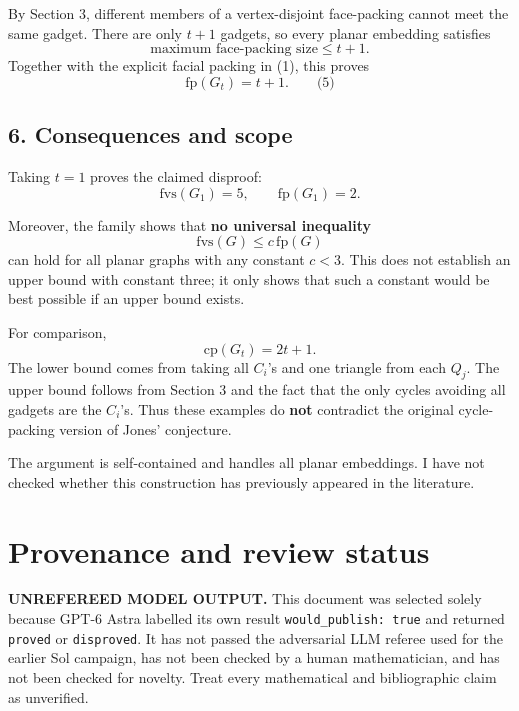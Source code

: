 \documentclass[
  11pt,
  a4paper,
]{article}
\begin{document}
By Section 3, different members of a vertex-disjoint face-packing cannot
meet the same gadget. There are only \(t+1\) gadgets, so every planar
embedding satisfies \[
\text{maximum face-packing size}\le t+1.
\] Together with the explicit facial packing in (1), this proves \[
\boxed{\mathrm{fp}(G_t)=t+1.} \qquad\text{(5)}
\]

\subsection{6. Consequences and scope}\label{consequences-and-scope}

Taking \(t=1\) proves the claimed disproof: \[
\mathrm{fvs}(G_1)=5,
\qquad
\mathrm{fp}(G_1)=2.
\]

Moreover, the family shows that \textbf{no universal inequality} \[
\mathrm{fvs}(G)\le c\,\mathrm{fp}(G)
\] can hold for all planar graphs with any constant \(c<3\). This does
not establish an upper bound with constant three; it only shows that
such a constant would be best possible if an upper bound exists.

For comparison, \[
\mathrm{cp}(G_t)=2t+1.
\] The lower bound comes from taking all \(C_i\)'s and one triangle from
each \(Q_j\). The upper bound follows from Section 3 and the fact that
the only cycles avoiding all gadgets are the \(C_i\)'s. Thus these
examples do \textbf{not} contradict the original cycle-packing version
of Jones' conjecture.

The argument is self-contained and handles all planar embeddings. I have
not checked whether this construction has previously appeared in the
literature.

\appendix

\section{Provenance and review
status}\label{provenance-and-review-status}

\begin{warning}

\textbf{UNREFEREED MODEL OUTPUT.} This document was selected solely
because GPT-6 Astra labelled its own result
\texttt{would\_publish:\ true} and returned \texttt{proved} or
\texttt{disproved}. It has not passed the adversarial LLM referee used
for the earlier Sol campaign, has not been checked by a human
mathematician, and has not been checked for novelty. Treat every
mathematical and bibliographic claim as unverified.

\end{warning}
\end{document}
